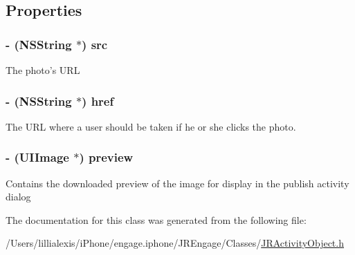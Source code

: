 \subsection{Properties}
\hypertarget{interface_j_r_image_media_object_aad75823f9189dfca758bc4d4712c3621}{
\subsubsection[{src}]{\setlength{\rightskip}{0pt plus 5cm}-\/ (NSString $\ast$) src}}
\label{interface_j_r_image_media_object_aad75823f9189dfca758bc4d4712c3621}
The photo's URL \hypertarget{interface_j_r_image_media_object_a95642c3f4bc97a112a3ab32beef46f66}{
\subsubsection[{href}]{\setlength{\rightskip}{0pt plus 5cm}-\/ (NSString $\ast$) href}}
\label{interface_j_r_image_media_object_a95642c3f4bc97a112a3ab32beef46f66}
The URL where a user should be taken if he or she clicks the photo. \hypertarget{interface_j_r_image_media_object_adffd5bbca7eb9c92e720b821022aca88}{
\subsubsection[{preview}]{\setlength{\rightskip}{0pt plus 5cm}-\/ (UIImage $\ast$) preview}}
\label{interface_j_r_image_media_object_adffd5bbca7eb9c92e720b821022aca88}
Contains the downloaded preview of the image for display in the publish activity dialog 

The documentation for this class was generated from the following file:\begin{DoxyCompactItemize}
\item 
/Users/lillialexis/iPhone/engage.iphone/JREngage/Classes/\hyperlink{_j_r_activity_object_8h}{JRActivityObject.h}\end{DoxyCompactItemize}
